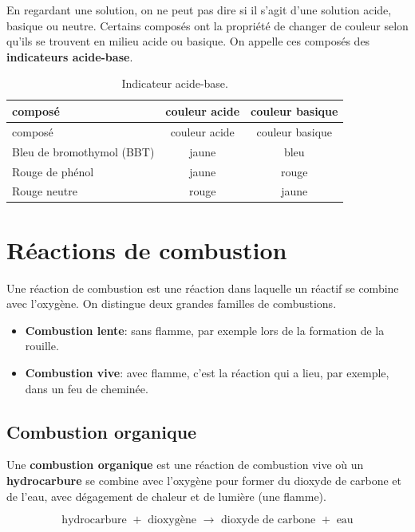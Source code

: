 \documentclass[
  11pt,
  a4paper,
  openany]{book}
\providecommand{\tightlist}{%
  \setlength{\itemsep}{0pt}\setlength{\parskip}{0pt}}
\begin{document}
En regardant une solution, on ne peut pas dire si il s'agit d'une solution acide, basique ou neutre. Certains composés ont la propriété de changer de couleur selon qu'ils se trouvent en milieu acide ou basique. On appelle ces composés des \textbf{indicateurs acide-base}.

\begin{longtable}[]{@{}lcc@{}}
\caption{\label{tab:indicateur-acide-base} Indicateur acide-base.}\tabularnewline
\toprule\noalign{}
composé & couleur acide & couleur basique \\
\midrule\noalign{}
\endfirsthead
\toprule\noalign{}
composé & couleur acide & couleur basique \\
\midrule\noalign{}
\endhead
\bottomrule\noalign{}
\endlastfoot
Bleu de bromothymol (BBT) & jaune & bleu \\
Rouge de phénol & jaune & rouge \\
Rouge neutre & rouge & jaune \\
\end{longtable}

\section{Réactions de combustion}\label{ruxe9actions-de-combustion}

Une réaction de combustion est une réaction dans laquelle un réactif se combine avec l'oxygène. On distingue deux grandes familles de combustions.

\begin{itemize}
\tightlist
\item
  \textbf{Combustion lente}: sans flamme, par exemple lors de la formation de la rouille.
\item
  \textbf{Combustion vive}: avec flamme, c'est la réaction qui a lieu, par exemple, dans un feu de cheminée.
\end{itemize}

\subsection{Combustion organique}\label{combustion-organique}

Une \textbf{combustion organique} est une réaction de combustion vive où un \textbf{hydrocarbure} se combine avec l'oxygène pour former du dioxyde de carbone et de l'eau, avec dégagement de chaleur et de lumière (une flamme).

\[ \text{hydrocarbure } + \text{ dioxygène } \longrightarrow \text{ dioxyde de carbone } + \text{ eau} \]
\end{document}
